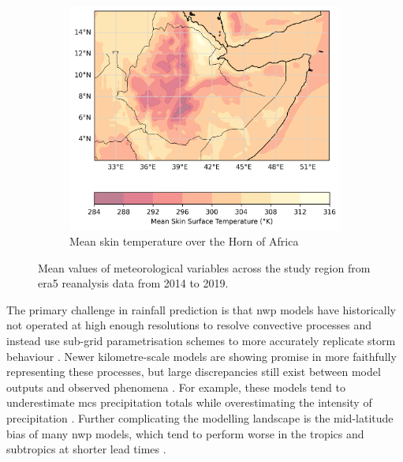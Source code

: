 \begin{figure}[ht]
\begin{subfigure}[t]{0.45\textwidth}
    \label{fig:mean_swvl1}
\end{subfigure}
\hfill
\begin{subfigure}[t]{0.45\textwidth}
    \includegraphics[width=\textwidth]{../figures/generated/exploration/mean_skt.png}
    \caption{Mean skin temperature over the Horn of Africa}
    \label{fig:mean_skt}
\end{subfigure}

\caption{Mean values of meteorological variables across the study region from \acrshort{era5} reanalysis data from 2014 to 2019.}
\label{fig:figures}
\end{figure}

\clearpage

The primary challenge in rainfall prediction is that \acrfull{nwp} models have historically not operated at high enough resolutions to resolve convective processes and instead use sub-grid parametrisation schemes to more accurately replicate storm behaviour \citep{Stevens2019,Yano2018}. Newer kilometre-scale models are showing promise in more faithfully representing these processes, but large discrepancies still exist between model outputs and observed phenomena \citep{Feng2025,Yano2018}. For example, these models tend to underestimate \acrshort{mcs} precipitation totals while overestimating the intensity of precipitation \citep{Feng2025,Stevens2019}. Further complicating the modelling landscape is the mid-latitude bias of many \acrshort{nwp} models, which tend to perform worse in the tropics and subtropics at shorter lead times \citep{Keane2025}. 

